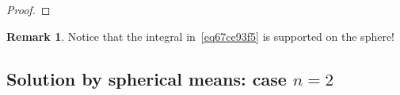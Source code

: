 \documentclass[a4paper,9pt]{amsart}
\newcommand{\R}{\mathbb{R}}	%
\newcommand{\did}{\,\mathrm{d}}	%
\newcommand{\de}{\partial}		%
\newcommand{\laplacian}{\triangle}
\newcommand{\grad}{\nabla}
\def\Xint#1{\mathchoice
      {\XXint\displaystyle\textstyle{#1}}%
      {\XXint\textstyle\scriptstyle{#1}}%
      {\XXint\scriptstyle\scriptscriptstyle{#1}}%
      {\XXint\scriptscriptstyle\scriptscriptstyle{#1}}%
      \!\int}
\def\XXint#1#2#3{{\setbox0=\hbox{$#1{#2#3}{\int}$}
        \vcenter{\hbox{$#2#3$}}\kern-.5\wd0}}
\def\fint{\Xint-}
\theoremstyle{plain}
\newtheorem{theorem}[proposition]{Theorem}
\theoremstyle{definition}
\newtheorem{remark}[proposition]{Remark}
\theoremstyle{remark}
\begin{document}
\begin{proof}
\end{proof}



\begin{remark}
	Notice that the integral in~\eqref{eq67ce93f5} is supported on the sphere!
\end{remark}
%

\subsection{Solution by spherical means: case $n=2$}\label{subs67ce94b2}
\end{document}
